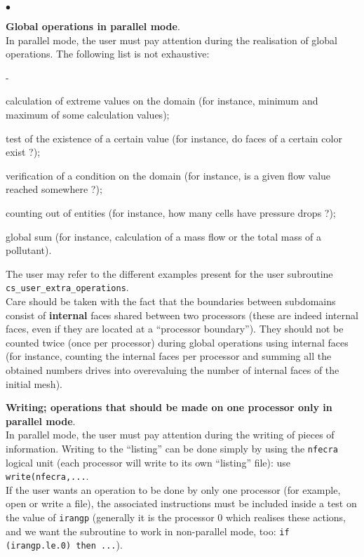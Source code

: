 {{{\begin{list}{$\bullet$}{}
\item {\bf Global operations in parallel mode}.\\
In parallel mode, the user must pay attention during the realisation of
      global operations. The following list is not exhaustive:
        \begin{list}{-}{}
\item calculation of extreme values on the domain (for instance, minimum
      and maximum of some calculation values);
\item test of the existence of a certain value (for instance, do faces
      of a certain color exist ?);
\item verification of a condition on the domain (for instance, is a
      given flow value reached somewhere ?);
\item counting out of entities (for instance, how many cells have
      pressure drops ?);
\item global sum (for instance, calculation of a mass flow or the total
      mass of a pollutant).
      \end{list}
The user may refer to the different examples present for the user
      subroutine \texttt{cs\_user\_extra\_operations}. \\
Care should be taken with the fact that the boundaries between
      subdomains consist of {\bf internal} faces shared between
      two processors (these are indeed internal faces, even if they are
      located at a ``processor boundary''). They should not be counted twice
      (once per processor) during global operations using internal faces
      (for instance, counting the internal faces per processor and
      summing all the obtained numbers drives into overevaluing the
      number of internal faces of the initial mesh).

\item {\bf Writing; operations that should be made on one
      processor only in parallel mode}.\\
In parallel mode, the user must pay attention during the writing of
      pieces of information. Writing to the ``listing'' can be done
      simply by using the \texttt{nfecra} logical unit (each processor will write
      to its own ``listing'' file): use
      \texttt{write(nfecra,...}. \\
If the user wants an operation to be done by only one processor (for
      example, open or write a file), the associated instructions must
      be included inside a test on the value of \texttt{irangp} (generally it is
      the processor 0 which realises these actions, and we want the
      subroutine to work in non-parallel mode, too: \texttt{if
      (irangp.le.0) then ...}).
\end{list}

}}}
